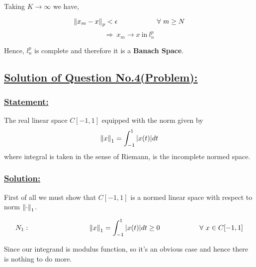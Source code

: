 \documentclass[a4paper,12pt]{article}
\begin{document}
    Taking $K\to \infty$ we have,

    \[\norm{x_m -x}_p < \epsilon \hspace*{2cm} \forall\ m\geq N\]
    \[\Rightarrow\ x_m\to x\ \mbox{in}\ l_n^{p}\]

    Hence, $l_n^{p}$ is complete and therefore it is a {\bf Banach Space}.

    \pagebreak

    \subsection*{\underline{Solution of Question No.4(Problem):}}


    \begin{tcolorbox}
        \subsubsection*{\underline{{\bf Statement:}}}

    The real linear space $C[-1,1]$ equipped with the norm given by 
    \[\norm{x}_1 = \int_{-1}^{1} |x(t)|dt\]
    where integral is taken in the sense of Riemann, is the incomplete normed space. 

    \vspace*{0.2cm}

    \begin{center}
        \def\svgwidth{10cm}
        
    \end{center}
    \end{tcolorbox}

    \subsubsection*{\underline{{\bf Solution:}}}

    First of all we must show that $C[-1,1]$ is a normed linear space with respect to norm $\norm{\cdot}_1$.

    \[N_1:\hspace*{3cm} \norm{x}_1 = \int_{-1}^{1}|x(t)|dt \geq 0\hspace*{2cm} \forall\ x\in C[-1,1]\]

    \begin{center}
        Since our integrand is modulus function, so it's an obvious case and hence there is nothing to do more.
    \end{center}

    \vspace*{0.3cm}
\end{document}
